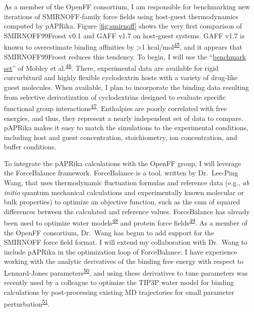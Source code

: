 \documentclass[11pt,notitlepage]{article}
\begin{document}
As a member of the OpenFF consortium, I am responsible for benchmarking
new iterations of SMIRNOFF-family force fields using host-guest
thermodynamics computed by pAPRika. Figure \ref{fig:smirnoff} shows the
very first comparison of SMIRNOFF99Frosst v0.1 and GAFF v1.7 on
host-guest systems. GAFF v1.7 is known to overestimate binding
affinities by \textgreater{}1
kcal/mol\textsuperscript{\protect\hyperlink{ref-HVgz5rZq}{45}}, and it
appears that SMIRNOFF99Frosst reduces this tendency. To begin, I will
use the ``\href{https://escholarship.org/uc/item/9p37m6bq}{benchmark
set}'' of Mobley et
al.\textsuperscript{\protect\hyperlink{ref-12BD3oHp4}{46}}. There,
experimental data are available for rigid curcurbituril and highly
flexible cyclodextrin hosts with a variety of drug-like guest molecules.
When available, I plan to incorporate the binding data resulting from
selective derivatization of cyclodextrins designed to evaluate specific
functional group
interactions\textsuperscript{\protect\hyperlink{ref-13gqBX78S}{47}}.
Enthalpies are poorly correlated with free energies, and thus, they
represent a nearly independent set of data to compare. pAPRika makes it
easy to match the simulations to the experimental conditions, including
host and guest concentration, stoichiometry, ion concentration, and
buffer conditions.

To integrate the pAPRika calculations with the OpenFF group, I will
leverage the ForceBalance framework. ForceBalance is a tool, written by
Dr.~Lee-Ping Wang, that uses thermodynamic fluctuation formulas and
reference data (e.g., \emph{ab initio} quantum mechanical calculations
and experimentally known molecular or bulk properties) to optimize an
objective function, such as the sum of squared differences between the
calculated and reference values. ForceBalance has already been used to
optimize water
models\textsuperscript{\protect\hyperlink{ref-50lAQZra}{48}} and protein
force fields\textsuperscript{\protect\hyperlink{ref-1E3wArY0j}{49}}. As
a member of the OpenFF consortium, Dr.~Wang has begun to add support for
the SMIRNOFF force field format. I will extend my collaboration with
Dr.~Wang to include pAPRika in the optimization loop of ForceBalance. I
have experience working with the analytic derivatives of the binding
free energy with respect to Lennard-Jones
parameters\textsuperscript{\protect\hyperlink{ref-xRauI5mb}{50}}, and
using these derivatives to tune parameters was recently used by a
colleague to optimize the TIP3P water model for binding calculations by
post-processing existing MD trajectories for small parameter
perturbation\textsuperscript{\protect\hyperlink{ref-NeqIQDLp}{51}}.
\end{document}
